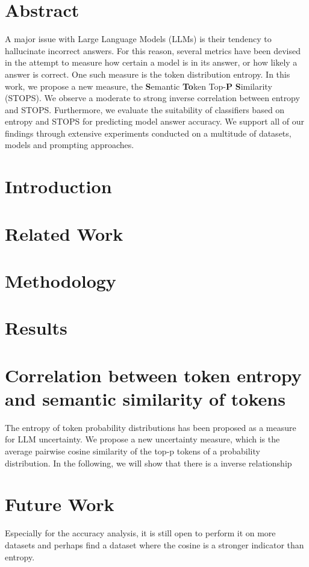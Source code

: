 \documentclass{article}
\title{}
\date{}
\begin{document}
\maketitle

\section{Abstract}
A major issue with Large Language Models (LLMs) is their tendency to hallucinate incorrect answers.
For this reason, several metrics have been devised in the attempt to measure how certain a model is 
in its answer, or how likely a answer is correct. One such measure is the token distribution entropy.  
In this work, we propose a new measure, the \textbf{S}emantic \textbf{To}ken Top-\textbf{P} \textbf{S}imilarity
 (STOPS). We observe a moderate to strong inverse correlation between entropy and STOPS. Furthermore, we evaluate the 
 suitability of classifiers based on entropy and STOPS for predicting model answer accuracy. 
 We support all of our findings through extensive experiments conducted on a multitude of datasets, models and prompting approaches.

 \section{Introduction}

 \section{Related Work}

 \section{Methodology}

 \section{Results}


 \section{Correlation between token entropy and semantic similarity of tokens}
The entropy of token probability distributions has been proposed as a measure for LLM uncertainty.
We propose a new uncertainty measure, which is the average pairwise cosine similarity of the top-p tokens of a probability distribution.
In the following, we will show that there is a inverse relationship




\section{Future Work}
Especially for the accuracy analysis, it is still open to perform it on more datasets and perhaps 
find a dataset where the cosine is a stronger indicator than entropy.
\end{document}
